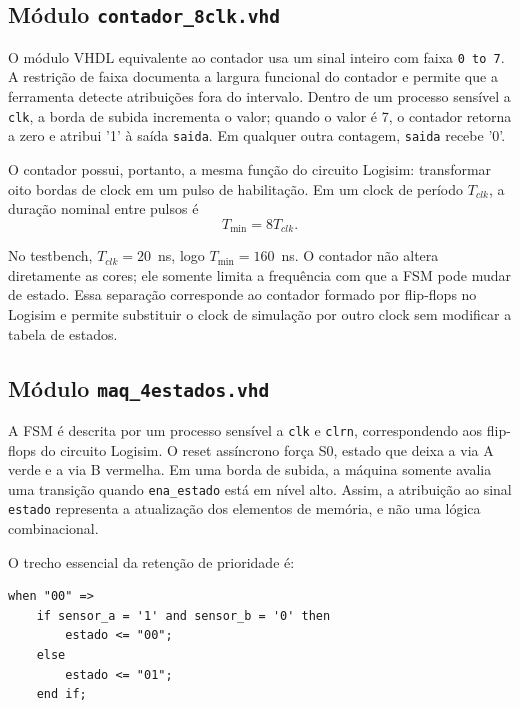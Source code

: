 \documentclass[conference]{IEEEtran}
\begin{document}
\subsection{Módulo \texttt{contador\_8clk.vhd}}

O módulo VHDL equivalente ao contador usa um sinal inteiro com faixa
\texttt{0 to 7}. A restrição de faixa documenta a largura funcional do
contador e permite que a ferramenta detecte atribuições fora do intervalo.
Dentro de um processo sensível a \texttt{clk}, a borda de subida incrementa
o valor; quando o valor é 7, o contador retorna a zero e atribui '1' à saída
\texttt{saida}. Em qualquer outra contagem, \texttt{saida} recebe '0'.

O contador possui, portanto, a mesma função do circuito Logisim:
transformar oito bordas de clock em um pulso de habilitação. Em um clock de
período \(T_{clk}\), a duração nominal entre pulsos é
\begin{equation}
T_{\min}=8T_{clk}.
\label{eq:tmin}
\end{equation}

No testbench, \(T_{clk}=20\)~ns, logo \(T_{\min}=160\)~ns. O contador não
altera diretamente as cores; ele somente limita a frequência com que a FSM
pode mudar de estado. Essa separação corresponde ao contador formado por
flip-flops no Logisim e permite substituir o clock de simulação por outro
clock sem modificar a tabela de estados.

\subsection{Módulo \texttt{maq\_4estados.vhd}}

A FSM é descrita por um processo sensível a \texttt{clk} e \texttt{clrn},
correspondendo aos flip-flops do circuito Logisim. O reset assíncrono força
S0, estado que deixa a via A verde e a via B vermelha. Em uma borda de
subida, a máquina somente avalia uma transição quando
\texttt{ena\_estado} está em nível alto. Assim, a atribuição ao sinal
\texttt{estado} representa a atualização dos elementos de memória, e não
uma lógica combinacional.

O trecho essencial da retenção de prioridade é:

\begin{lstlisting}[caption={Trecho da FSM para a prioridade da via A},
label={lst:fsm}]
when "00" =>
    if sensor_a = '1' and sensor_b = '0' then
        estado <= "00";
    else
        estado <= "01";
    end if;
\end{lstlisting}
\end{document}
